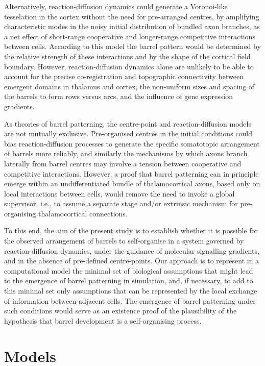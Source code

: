 \documentclass[9pt,twocolumn,twoside,lineno]{pnas-new}
\begin{document}
Alternatively, reaction-diffusion dynamics could generate a Voronoi-like
tesselation in the cortex without the need for pre-arranged centres, by
amplifying characteristic modes in the noisy initial distribution of bundled
axon branches, as a net effect of short-range cooperative and longer-range
competitive interactions between cells. According to this model the barrel
pattern would be determined by the relative strength of these interactions and
by the shape of the cortical field boundary. However, reaction-diffusion
dynamics alone are unlikely to be able to account for the precise
co-registration and topographic connectivity between emergent domains in
thalamus and cortex, the non-uniform sizes and spacing of the barrels to form
rows versus arcs, and the influence of gene expression gradients.

As theories of barrel patterning, the centre-point and reaction-diffusion
models are not mutually exclusive. Pre-organised centres in the initial
conditions could bias reaction-diffusion processes to generate the specific
somatotopic arrangement of barrels more reliably, and similarly the mechanisms
by which axons branch laterally from barrel centres may involve a tension
between cooperative and competitive interactions. However, a proof that barrel
patterning can in principle emerge within an undifferentiated bundle of
thalamocortical axons, based only on local interactions between cells, would
remove the need to invoke a global supervisor, i.e., to assume a separate
stage and/or extrinsic mechanism for pre-organising thalamocortical
connections.

To this end, the aim of the present study is to establish whether it is
possible for the observed arrangement of barrels to self-organise in a system
governed by reaction-diffusion dynamics, under the guidance of molecular
signalling gradients, and in the absence of pre-defined centre-points. Our
approach is to represent in a computational model the minimal set of
biological assumptions that might lead to the emergence of barrel patterning
in simulation, and, if necessary, to add to this minimal set only assumptions
that can be represented by the local exchange of information between adjacent
cells. The emergence of barrel patterning under such conditions would serve as
an existence proof of the plausibility of the hypothesis that barrel
development is a self-organising process.

\section*{Models}
\end{document}
